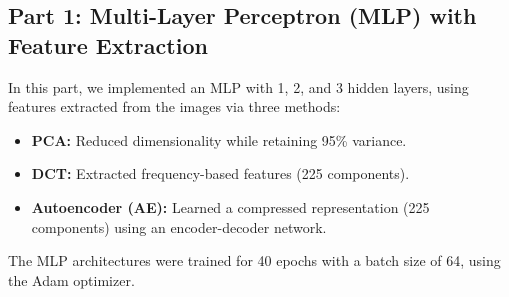 \documentclass[a4paper,12pt]{article}
\begin{document}
\subsection{Part 1: Multi-Layer Perceptron (MLP) with Feature Extraction}
In this part, we implemented an MLP with 1, 2, and 3 hidden layers, using features extracted from the images via three methods:
\begin{itemize}
    \item \textbf{PCA:} Reduced dimensionality while retaining 95\% variance.
    \item \textbf{DCT:} Extracted frequency-based features (225 components).
    \item \textbf{Autoencoder (AE):} Learned a compressed representation (225 components) using an encoder-decoder network.
\end{itemize}
The MLP architectures were trained for 40 epochs with a batch size of 64, using the Adam optimizer.
\end{document}

